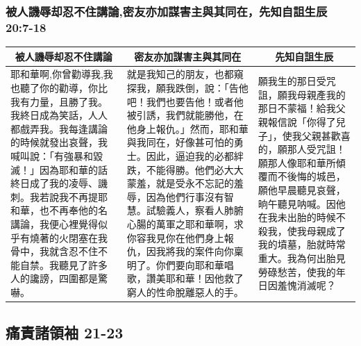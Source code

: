 \subsubsection{被人譏辱却忍不住講論,密友亦加謀害主與其同在，先知自詛生辰 20:7-18}
\begin{table}[H]
\centering
\begin{tabular}{p{5.25cm}|p{6.75cm}|p{4.75cm}}\hline\hline
\multicolumn{1}{c|}{被人譏辱却忍不住講論}&\multicolumn{1}{c|}{密友亦加謀害主與其同在}&\multicolumn{1}{c}{先知自詛生辰}\\\hline
耶和華啊,你曾勸導我,我也聽了你的勸導，你比我有力量，且勝了我。我終日成為笑話，人人都戲弄我。我每逢講論的時候就發出哀聲，我喊叫說：「有強暴和毀滅！」因為耶和華的話終日成了我的凌辱、譏刺。我若說我不再提耶和華，也不再奉他的名講論，我便心裡覺得似乎有燒著的火閉塞在我骨中，我就含忍不住不能自禁。我聽見了許多人的讒謗，四圍都是驚嚇。
&就是我知己的朋友，也都窺探我，願我跌倒，說：「告他吧！我們也要告他！或者他被引誘，我們就能勝他，在他身上報仇。」然而，耶和華與我同在，好像甚可怕的勇士。因此，逼迫我的必都絆跌，不能得勝。他們必大大蒙羞，就是受永不忘記的羞辱，因為他們行事沒有智慧。試驗義人，察看人肺腑心腸的萬軍之耶和華啊，求你容我見你在他們身上報仇，因我將我的案件向你稟明了。你們要向耶和華唱歌，讚美耶和華！因他救了窮人的性命脫離惡人的手。
&願我生的那日受咒詛，願我母親產我的那日不蒙福！給我父親報信說「你得了兒子」，使我父親甚歡喜的，願那人受咒詛！願那人像耶和華所傾覆而不後悔的城邑，願他早晨聽見哀聲，晌午聽見呐喊。因他在我未出胎的時候不殺我，使我母親成了我的墳墓，胎就時常重大。我為何出胎見勞碌愁苦，使我的年日因羞愧消滅呢？\\\hline
\end{tabular}
\end{table}


\subsection{痛責諸領袖 21-23}
